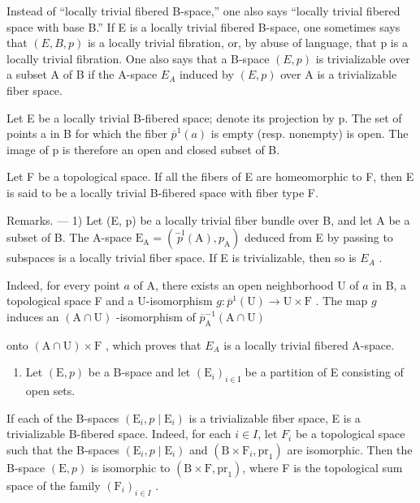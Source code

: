 Instead of “locally trivial fibered B-space,” one also says “locally trivial fibered space with base B.” If E is a locally trivial fibered B-space, one sometimes says that \((E,B,p)\) is a locally trivial fibration, or, by abuse of language, that p is a locally trivial fibration. One also says that a B-space \((E,p)\) is trivializable over a subset A of B if the A-space \(E_{A}\) induced by \((E,p)\) over A is a trivializable fiber space.

Let E be a locally trivial B-fibered space; denote its projection by p. The set of points a in B for which the fiber \(\overline{p}^{1}(a)\) is empty (resp. nonempty) is open. The image of p is therefore an open and closed subset of B.

Let F be a topological space. If all the fibers of E are homeomorphic to F, then E is said to be a locally trivial B-fibered space with fiber type F.

Remarks. --- 1) Let (E, p) be a locally trivial fiber bundle over B, and let A be a subset of B. The A-space \(\mathrm{E}_{\mathrm{A}} = (\stackrel{-1}{p}(\mathrm{A}), p_{\mathrm{A}})\) deduced from E by passing to subspaces is a locally trivial fiber space. If E is trivializable, then so is \(E_{A}\) .

Indeed, for every point \(a\) of A, there exists an open neighborhood U of \(a\) in B, a topological space F and a U-isomorphism \(g\colon \overline{p}^{1}(\mathrm{U})\to \mathrm{U}\times \mathrm{F}\) . The map \(g\) induces an \((\mathrm{A}\cap \mathrm{U})\) -isomorphism of \(\overline{p}_{\mathrm{A}}^{-1}(\mathrm{A}\cap \mathrm{U})\)

onto \((\mathrm{A}\cap\mathrm{U})\times\mathrm{F}\) , which proves that \(E_{A}\) is a locally trivial fibered A-space.

\begin{enumerate}
\def\labelenumi{\arabic{enumi})}
\setcounter{enumi}{1}
\tightlist
\item
  Let \((\mathrm{E}, p)\) be a B-space and let \((\mathrm{E}_{i})_{i \in \mathrm{I}}\) be a partition of E consisting of open sets.
\end{enumerate}

If each of the B-spaces \((\mathrm{E}_{i}, p \mid \mathrm{E}_{i})\) is a trivializable fiber space, E is a trivializable B-fibered space. Indeed, for each \(i \in I\), let \(F_{i}\) be a topological space such that the B-spaces \((\mathrm{E}_{i}, p \mid \mathrm{E}_{i})\) and \((\mathrm{B} \times \mathrm{F}_{i}, \mathrm{pr}_{1})\) are isomorphic. Then the B-space \((\mathrm{E}, p)\) is isomorphic to \((\mathrm{B} \times \mathrm{F}, \mathrm{pr}_{1})\), where F is the topological sum space of the family \((\mathrm{F}_{i})_{i \in I}\) .

